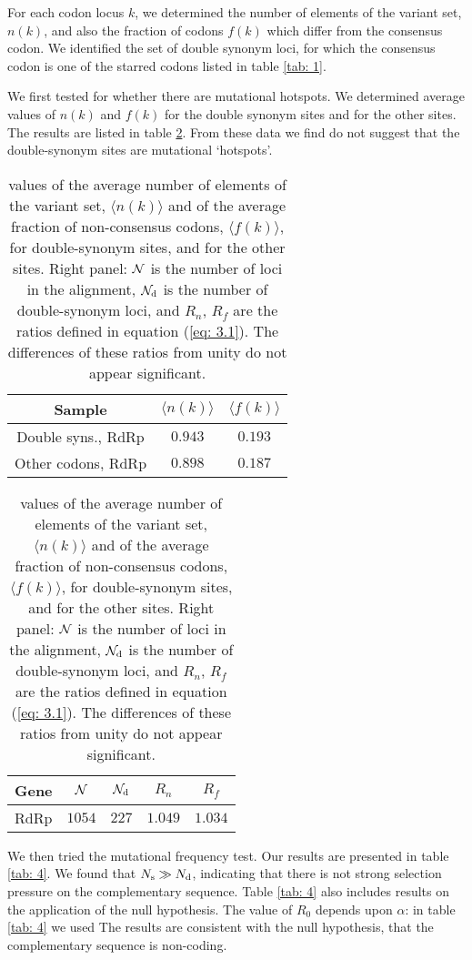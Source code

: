 \documentclass[9pt,lineno]{elife}
\newcommand{\MW}[1]{{\color{magenta}{#1}}}
\begin{document}
For each codon locus $k$, we determined the number of elements of the variant set, $n(k)$, 
and also the fraction of codons $f(k)$ which differ from the consensus codon.
We identified the set of double synonym loci, for which the consensus codon is one of the 
starred codons listed in table \ref{tab: 1}. 

We first tested for whether there are mutational hotspots. We determined average values 
of $n(k)$ and $f(k)$ for the double synonym sites and for the other sites. The results are listed in table 
\ref{tab: 3}. From these data we find do not suggest that the double-synonym sites are mutational \lq hotspots'.

\begin{table}[h]
\begin{minipage}{0.5\textwidth}
\centering
\begin{tabular}{|c|c|c|}
\hline
Sample&$\langle n(k)\rangle$&$\langle f(k)\rangle$\\ 
\hline
Double syns., RdRp  &$0.943$&$0.193$\\ 
Other codons, RdRp  &$0.898$&$0.187$\\
\hline
\end{tabular}
\end{minipage}
\begin{minipage}{0.4\textwidth}
\centering
\begin{tabular}{|c|c|c|c|c|}
\hline
Gene&${\cal N}$&${\cal N}_{\rm d}$&$R_n$&$R_f$\\ 
\hline
RdRp  &$1054$&$227$&$1.049$&$1.034$\\ 
\hline
\end{tabular}
\end{minipage}
\caption{\MW{Summary of results of \lq mutational hotspots' test. Left panel:} values of the average number 
of elements of the variant set, $\langle n(k)\rangle$ and of the average fraction of non-consensus 
codons, $\langle f(k)\rangle$, for double-synonym sites,  and for the other sites.
Right panel: ${\cal N}$ is the number of loci in the alignment, ${\cal N}_{\rm d}$ is the 
number of double-synonym loci, and $R_n$, $R_f$ are the ratios defined in equation (\ref{eq: 3.1}). 
The differences of these ratios from unity do not appear significant.
\label{tab: 3}}
\end{table}

We then tried the mutational frequency test. Our results are presented in table \ref{tab: 4}. 
We found that $N_{\rm s}\gg N_{\rm d}$, indicating that there is not strong 
selection pressure on the complementary sequence.
Table \ref{tab: 4} also includes results on the application of the null hypothesis.
The value of $R_0$ depends upon $\alpha$: in table \ref{tab: 4} we used \MW{$\alpha=3.13$, 
as derived from our observed nucleotide mutations.}  The results are consistent with the null hypothesis, 
that the complementary sequence is non-coding. 
\end{document}
